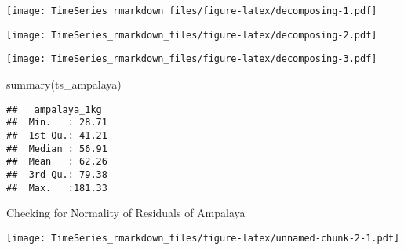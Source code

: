 \documentclass[
]{article}
\newenvironment{Shaded}{\begin{snugshade}}{\end{snugshade}}
\newcommand{\AttributeTok}[1]{\textcolor[rgb]{0.77,0.63,0.00}{#1}}
\newcommand{\FunctionTok}[1]{\textcolor[rgb]{0.00,0.00,0.00}{#1}}
\newcommand{\NormalTok}[1]{#1}
\newcommand{\SpecialCharTok}[1]{\textcolor[rgb]{0.00,0.00,0.00}{#1}}
\newcommand{\StringTok}[1]{\textcolor[rgb]{0.31,0.60,0.02}{#1}}
\begin{document}
\texttt{[image: TimeSeries\_rmarkdown\_files/figure-latex/decomposing-1.pdf]}

\begin{Shaded}
\end{Shaded}

\texttt{[image: TimeSeries\_rmarkdown\_files/figure-latex/decomposing-2.pdf]}

\begin{Shaded}
\end{Shaded}

\texttt{[image: TimeSeries\_rmarkdown\_files/figure-latex/decomposing-3.pdf]}

\begin{Shaded}
\begin{Highlighting}[]
\FunctionTok{summary}\NormalTok{(ts\_ampalaya)}
\end{Highlighting}
\end{Shaded}

\begin{verbatim}
##   ampalaya_1kg   
##  Min.   : 28.71  
##  1st Qu.: 41.21  
##  Median : 56.91  
##  Mean   : 62.26  
##  3rd Qu.: 79.38  
##  Max.   :181.33
\end{verbatim}

Checking for Normality of Residuals of Ampalaya

\begin{Shaded}
\end{Shaded}

\texttt{[image: TimeSeries\_rmarkdown\_files/figure-latex/unnamed-chunk-2-1.pdf]}

\begin{Shaded}
\end{Shaded}
\end{document}
